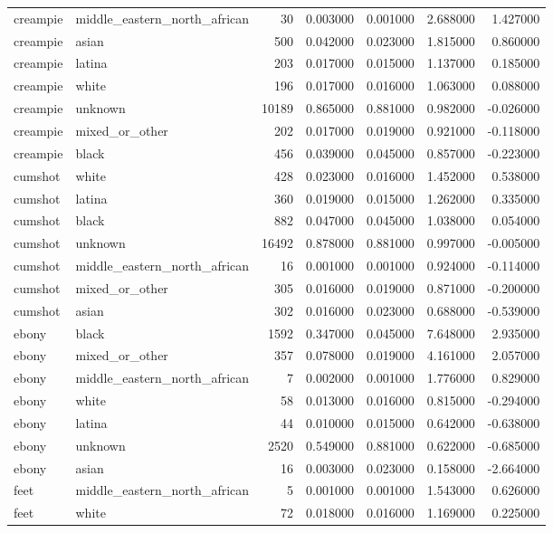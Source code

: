 \begin{tabular}{llrrrrr}
creampie & middle_eastern_north_african & 30 & 0.003000 & 0.001000 & 2.688000 & 1.427000 \\
creampie & asian & 500 & 0.042000 & 0.023000 & 1.815000 & 0.860000 \\
creampie & latina & 203 & 0.017000 & 0.015000 & 1.137000 & 0.185000 \\
creampie & white & 196 & 0.017000 & 0.016000 & 1.063000 & 0.088000 \\
creampie & unknown & 10189 & 0.865000 & 0.881000 & 0.982000 & -0.026000 \\
creampie & mixed_or_other & 202 & 0.017000 & 0.019000 & 0.921000 & -0.118000 \\
creampie & black & 456 & 0.039000 & 0.045000 & 0.857000 & -0.223000 \\
cumshot & white & 428 & 0.023000 & 0.016000 & 1.452000 & 0.538000 \\
cumshot & latina & 360 & 0.019000 & 0.015000 & 1.262000 & 0.335000 \\
cumshot & black & 882 & 0.047000 & 0.045000 & 1.038000 & 0.054000 \\
cumshot & unknown & 16492 & 0.878000 & 0.881000 & 0.997000 & -0.005000 \\
cumshot & middle_eastern_north_african & 16 & 0.001000 & 0.001000 & 0.924000 & -0.114000 \\
cumshot & mixed_or_other & 305 & 0.016000 & 0.019000 & 0.871000 & -0.200000 \\
cumshot & asian & 302 & 0.016000 & 0.023000 & 0.688000 & -0.539000 \\
ebony & black & 1592 & 0.347000 & 0.045000 & 7.648000 & 2.935000 \\
ebony & mixed_or_other & 357 & 0.078000 & 0.019000 & 4.161000 & 2.057000 \\
ebony & middle_eastern_north_african & 7 & 0.002000 & 0.001000 & 1.776000 & 0.829000 \\
ebony & white & 58 & 0.013000 & 0.016000 & 0.815000 & -0.294000 \\
ebony & latina & 44 & 0.010000 & 0.015000 & 0.642000 & -0.638000 \\
ebony & unknown & 2520 & 0.549000 & 0.881000 & 0.622000 & -0.685000 \\
ebony & asian & 16 & 0.003000 & 0.023000 & 0.158000 & -2.664000 \\
feet & middle_eastern_north_african & 5 & 0.001000 & 0.001000 & 1.543000 & 0.626000 \\
feet & white & 72 & 0.018000 & 0.016000 & 1.169000 & 0.225000 \\

\end{tabular}
